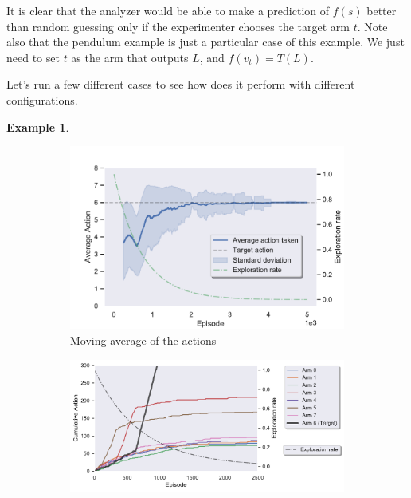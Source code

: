 \documentclass[11pt,a4paper,twoside]{report}
\newcommand{\+}{\textnormal{+} }
\theoremstyle{definition}
\newtheorem{myex}[mythm]{Example}
\numberwithin{equation}{chapter}
\begin{document}
  \par It is clear that the analyzer would be able to make a prediction of
  $f(s)$ better than random guessing only if the experimenter chooses the target
  arm $t$. Note also that the pendulum example is just a particular case of this
  example. We just need to set $t$ as the arm that outputs $L$, and
  $f(v_t)=T(L)$.

  Let's run a few different cases to see how does it perform with different
  configurations.

  \begin{myex}\label{MAB1ex}

    \begin{figure}[]
      \centering
      \begin{subfigure}{.5\textwidth}
        \centering
        \includegraphics[width=1\linewidth]{figures/Actions-MAB1.pdf}
        \caption{Moving average of the actions}
        \label{fig:ActionAverageMAB1}
      \end{subfigure}%
      \begin{subfigure}{.5\textwidth}
        \centering
        \includegraphics[width=1\linewidth]{figures/Cum-action-MAB1.pdf}

\end{subfigure}
\end{figure}
\end{myex}
\end{document}
